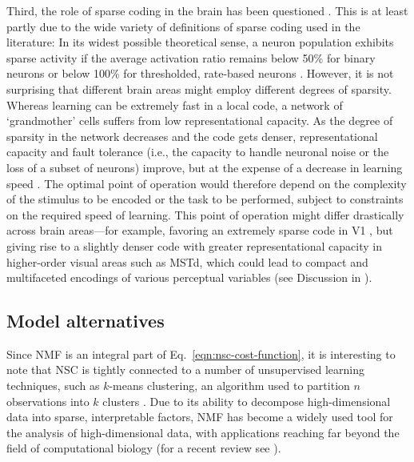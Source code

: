 Third, the role of sparse coding in the brain has been questioned
\cite{SpanneJorntell2015,BarthPoulet2012}.
This is at least partly due to the wide variety of definitions of sparse
coding used in the literature:
In its widest possible theoretical sense,
a neuron population exhibits sparse activity if the average activation ratio
remains below 50\% for binary neurons 
or below 100\% for thresholded,
rate-based neurons \cite{SpanneJorntell2015}.
However, it is not surprising that different brain areas might employ
different degrees of sparsity.
Whereas learning can be extremely fast in a local code,
a network of `grandmother' cells suffers from low representational capacity.
As the degree of sparsity in the network decreases and the code gets denser,
representational capacity and fault tolerance 
(i.e., the capacity to handle neuronal noise or the loss of a subset of neurons)
improve,
but at the expense of a decrease in learning speed
\cite{Foldiak1990,SpanneJorntell2015}.
The optimal point of operation would therefore depend on the complexity of
the stimulus to be encoded or the task to be performed,
subject to constraints on the required speed of learning.
This point of operation might differ drastically across brain areas---for example,
favoring an extremely sparse code in \ac{V1}
\cite{OlshausenField1996},
but giving rise to a slightly denser code with 
greater representational capacity in higher-order visual areas
such as \ac{MSTd}, 
which could lead to compact and multifaceted encodings
of various perceptual variables
(see Discussion in \cite{Beyeler2016}).


\subsection*{Model alternatives}

Since \ac{NMF} is an integral part 
of Eq.~\ref{eqn:nsc-cost-function},
it is interesting to note that \ac{NSC} is tightly connected
to a number of unsupervised learning techniques,
such as $k$-means clustering,
an algorithm used to partition
$n$ observations into $k$ clusters
\cite{Ding2005}.
Due to its ability to decompose high-dimensional data into
sparse, interpretable factors, \ac{NMF} has become a 
widely used tool for the analysis of high-dimensional data,
with applications reaching far beyond
the field of computational biology
(for a recent review see \cite{Gillis2014}).

